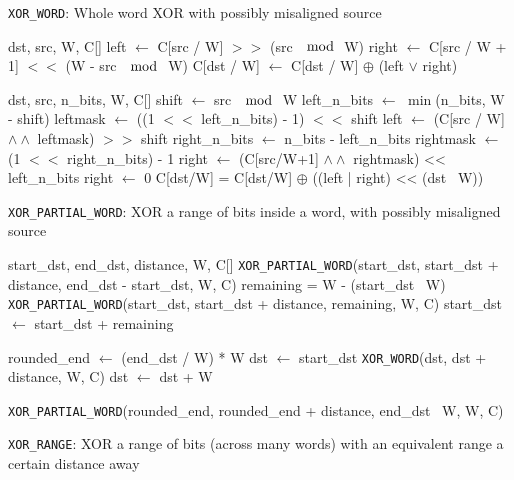 \begin{algorithm}
\caption{\texttt{XOR\_WORD}: Whole word XOR with possibly misaligned source}
\label{alg:xor_word}
\begin{algorithmic}[1]
  \REQUIRE dst, src, W, C[]
  \STATE left $\gets$ C[src / W] $>>$ (src $\mod$ W)
  \STATE right $\gets$ C[src / W + 1] $<<$ (W - src $\mod$ W)
  \STATE C[dst / W] $\gets$ C[dst / W] $\oplus$ (left $\lor$ right)
\end{algorithmic}
\end{algorithm}

\begin{algorithm}
\begin{algorithmic}[1]
  \REQUIRE dst, src, n\_bits, W, C[]
  \STATE shift $\gets$ src $\mod$ W
  \STATE left\_n\_bits $\gets$ $\min$(n\_bits, W - shift)
  \STATE leftmask $\gets$ ((1 $<<$ left\_n\_bits) - 1) $<<$ shift
  \STATE left $\gets$ (C[src / W] $\land\land$ leftmask) $>>$ shift
  \STATE right\_n\_bits $\gets$ n\_bits - left\_n\_bits
    \STATE rightmask $\gets$ (1 $<<$ right\_n\_bits) - 1
    \STATE right $\gets$ (C[src/W+1] $\land\land$ rightmask) << left\_n\_bits
  \ELSE
    \STATE right $\gets$ 0
  \ENDIF
  \STATE C[dst/W] = C[dst/W] $\oplus$ ((left | right) << (dst \ W))
  \caption{\texttt{XOR\_PARTIAL\_WORD}: XOR a range of bits inside a word, with possibly misaligned source}
  \label{alg:xor_partial_word}
\end{algorithmic}
\end{algorithm}

\begin{algorithm}
\begin{algorithmic}[1]
  \REQUIRE start\_dst, end\_dst, distance, W, C[]
    \STATE \texttt{XOR\_PARTIAL\_WORD}(start\_dst, start\_dst + distance, end\_dst - start\_dst, W, C)
  \ELSE
      \STATE remaining = W - (start\_dst \ W)
      \STATE \texttt{XOR\_PARTIAL\_WORD}(start\_dst, start\_dst + distance, remaining, W, C)
      \STATE start\_dst $\gets$ start\_dst + remaining
    \ENDIF
    
    \STATE rounded\_end $\gets$ (end\_dst / W) * W
    \STATE dst $\gets$ start\_dst
      \STATE \texttt{XOR\_WORD}(dst, dst + distance, W, C)
      \STATE dst $\gets$ dst + W
    \ENDWHILE
    
      \STATE \texttt{XOR\_PARTIAL\_WORD}(rounded\_end, rounded\_end + distance, end\_dst \ W, W, C)
    \ENDIF
  \ENDIF
  \label{alg:xor_range}
  \caption{\texttt{XOR\_RANGE}: XOR a range of bits (across many words) with an equivalent range a certain distance away}
\end{algorithmic}
\end{algorithm}

